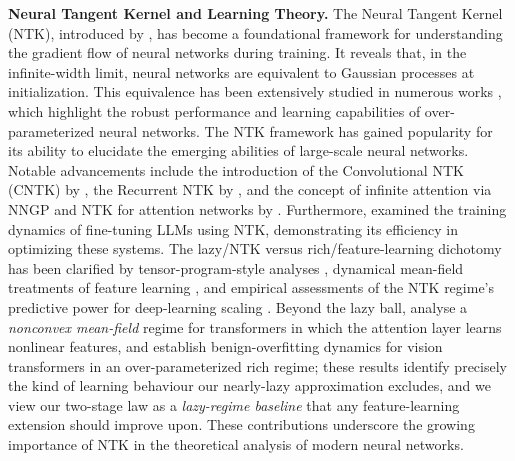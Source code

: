 \documentclass[11pt]{article}
\let\citet\citep
\theoremstyle{plain}
\begin{document}
{\bf Neural Tangent Kernel and Learning Theory.}
The Neural Tangent Kernel (NTK), introduced by \citet{jgh18}, has become a foundational framework for understanding the gradient flow of neural networks during training. It reveals that, in the infinite-width limit, neural networks are equivalent to Gaussian processes at initialization. This equivalence has been extensively studied in numerous works \citep{ll18, dzps19, sy19, azls19, wllm19, bm19, lsp+20, cb20, swl21, zgj21, sk22, gms23, gll+24, swl24}, which highlight the robust performance and learning capabilities of over-parameterized neural networks. The NTK framework has gained popularity for its ability to elucidate the emerging abilities of large-scale neural networks. Notable advancements include the introduction of the Convolutional NTK (CNTK) by \citet{adh+19}, the Recurrent NTK by \citet{awbb20}, and the concept of infinite attention via NNGP and NTK for attention networks by \citet{hbsdn20}. Furthermore, \citet{mwy+23} examined the training dynamics of fine-tuning LLMs using NTK, demonstrating its efficiency in optimizing these systems. The lazy/NTK versus rich/feature-learning dichotomy has been clarified by tensor-program-style analyses \citep{ynh+22, kar24}, dynamical mean-field treatments of feature learning \citep{boc+25, bcp24}, and empirical assessments of the NTK regime's predictive power for deep-learning scaling \citep{vbn22}. Beyond the lazy ball, \citet{ks24_nonlinear} analyse a {\it nonconvex mean-field} regime for transformers in which the attention layer learns nonlinear features, and \citet{jhz+24_benign} establish benign-overfitting dynamics for vision transformers in an over-parameterized rich regime; these results identify precisely the kind of learning behaviour our nearly-lazy approximation excludes, and we view our two-stage law as a {\it lazy-regime baseline} that any feature-learning extension should improve upon. These contributions underscore the growing importance of NTK in the theoretical analysis of modern neural networks.
\end{document}
